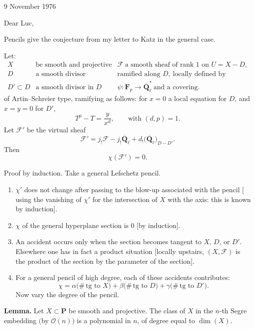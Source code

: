 \documentclass[11pt]{article}
\newcommand{\F}{\mathcal F}
\newcommand{\Qell}{\overline{\mathbf Q}_{\ell}}
\newcommand{\Fp}{\mathbf F_p}
\newcommand{\OO}{\mathcal O}
\newcommand{\PP}{\mathbf P}
\newcommand{\tg}{\mathrm{tg}}
\begin{document}
\thispagestyle{empty}

\noindent\hfill 9 November 1976

\vspace{1.1em}

Dear Luc,

Pencils give the conjecture from my letter to Katz in the general case.

Let:
\[
\begin{array}{rll}
X & \text{be smooth and projective} & \F\ \text{a smooth sheaf of rank }1\text{ on }U=X-D,\\[0.3em]
D & \text{a smooth divisor} & \text{ramified along }D,\ \text{locally defined by}\\[0.3em]
D'\subset D & \text{a smooth divisor in }D & \psi\colon \Fp\longrightarrow \Qell^{\ast}\ \text{and a covering.}
\end{array}
\]
of Artin--Schreier type, ramifying as follows: for \(x=0\) a local equation for \(D\), and \(x=y=0\) for \(D'\),
\[
T^p-T=\frac{y}{x^d},\qquad \text{with }(d,p)=1.
\]
Let \(\F'\) be the virtual sheaf
\[
\F'=j_!\F-j_!\Qell+d_!\bigl(\Qell\bigr)_{D-D'}.
\]
Then
\[
\chi(\F')=0.
\]

Proof by induction. Take a general Lefschetz pencil.

\begin{enumerate}[label=\alph*)]
\item \(\chi'\) does not change after passing to the blow-up associated with the pencil \([\)using the vanishing of \(\chi'\) for the intersection of \(X\) with the axis: this is known by induction\(]\).

\item \(\chi\) of the general hyperplane section is \(0\) \([\)by induction\(]\).

\item An accident occurs only when the section becomes tangent to \(X\), \(D\), or \(D'\). Elsewhere one has in fact a product situation \([\)locally upstairs, \((X,\F)\) is the product of the section by the parameter of the section\(]\).

\item For a general pencil of high degree, each of these accidents contributes:
\[
\chi=\alpha\bigl(\#\,\tg\text{ to }X\bigr)
+\beta\bigl(\#\,\tg\text{ to }D\bigr)
+\gamma\bigl(\#\,\tg\text{ to }D'\bigr).
\]
Now vary the degree of the pencil.
\end{enumerate}

\textbf{Lemma.} Let \(X\subset\PP\) be smooth and projective. The class of \(X\) in the \(n\)-th Segre embedding \((\)by \(\OO(n)\)\()\) is a polynomial in \(n\), of degree equal to \(\dim(X)\).
\end{document}
